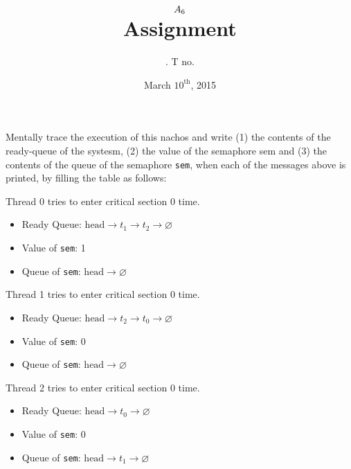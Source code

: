 \documentclass[11pt]{article}
\title{
    $A_{6}$ \\
    {\large Assignment \rom{\hw}}
}
\author{
    \name. T no. \tno
}
\date{March $10^{\text{th}}$, 2015}
\begin{document}
\maketitle

\begin{question}

    Mentally trace the execution of this nachos and write (1) the contents of the ready-queue of the systesm, (2) the value of the semaphore sem and (3) the contents of the queue of the semaphore {\tt sem}, when each of the messages above is printed, by filling the table as follows:

    \begin{subquestion}
        Thread 0 tries to enter critical section 0 time.

    \begin{itemize}
        \item{
            Ready Queue: $\text{head}\longrightarrow t_{1}\longrightarrow t_{2}\longrightarrow\varnothing$
        } \item{
            Value of {\tt sem}: 1
        } \item{
            Queue of {\tt sem}: $\text{head}\longrightarrow\varnothing$
        }
    \end{itemize}
    \end{subquestion}

    \begin{subquestion}
        Thread 1 tries to enter critical section 0 time.

    \begin{itemize}
        \item{
            Ready Queue: $\text{head}\longrightarrow t_{2}\longrightarrow t_{0}\longrightarrow\varnothing$
        } \item{
            Value of {\tt sem}: 0
        } \item{
            Queue of {\tt sem}: $\text{head}\longrightarrow\varnothing$
        }
    \end{itemize}
    \end{subquestion}

    \begin{subquestion}
        Thread 2 tries to enter critical section 0 time.

    \begin{itemize}
        \item{
            Ready Queue: $\text{head}\longrightarrow t_{0}\longrightarrow\varnothing$
        } \item{
            Value of {\tt sem}: 0
        } \item{
            Queue of {\tt sem}: $\text{head}\longrightarrow t_{1}\longrightarrow\varnothing$
        }
    \end{itemize}
    \end{subquestion}


\end{question}
\end{document}
